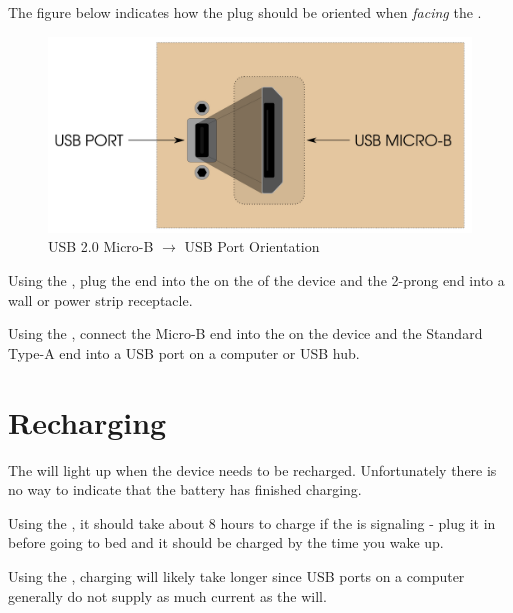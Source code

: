 The figure below indicates how the  plug should be oriented when
\textit{facing} the \hyperref[USB Port]{}.

\begin{figure}[H]
\centering
  \includegraphics{images/usb_orientation.png}
\caption{USB 2.0 Micro-B $\longrightarrow$ USB Port Orientation}
\end{figure}

Using the \hyperref[Power Adapter]{}, plug the  end into the
 on the  of the device and the 2-prong end into a wall or power
strip receptacle.

\par\medskip

Using the \hyperref[USB Cable]{}, connect the Micro-B end into the
 on the device and the Standard Type-A end into a USB port on a computer
or USB hub.

\section{Recharging} \label{Recharging}

The \hyperref[Low Battery Indicator]{} will light up when the device
needs to be recharged.  Unfortunately there is no way to indicate that the
battery has finished charging.

\par\medskip

Using the \hyperref[Power Adapter]{}, it should take about \num{8} hours
to charge if the \hyperref[Low Battery Indicator]{} is signaling - plug
it in before going to bed and it should be charged by the time you wake up.

\par\medskip

Using the \hyperref[USB Cable]{}, charging will likely take longer since
USB ports on a computer generally do not supply as much current as the
\hyperref[Power Adapter]{} will.
